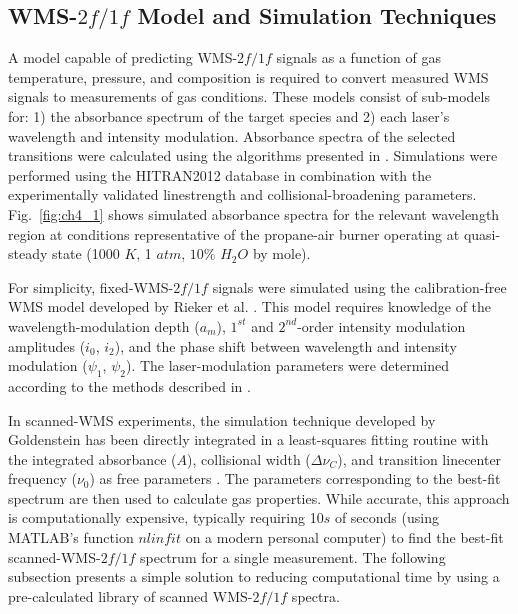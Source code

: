 \subsection{WMS-$2f/1f$ Model and Simulation Techniques}
A model capable of predicting WMS-$2f/1f$ signals as a function of gas temperature, pressure, and composition is required to convert measured WMS signals to measurements of gas conditions. These models consist of sub-models for: 1) the absorbance spectrum of the target species and 2) each laser's wavelength and intensity modulation.
Absorbance spectra of the selected transitions were calculated using the algorithms presented in \cite{GOLDENSTEIN2017249}. Simulations were performed using the HITRAN2012 database \cite{2013JQSRT.130....4R} in combination with the experimentally validated linestrength and collisional-broadening parameters. Fig.\ \ref{fig:ch4_1} shows simulated absorbance spectra for the relevant wavelength region at conditions representative of the propane-air burner operating at quasi-steady state (1000 $K$, 1 $atm$, $10\%$ $H_2O$ by mole). 

For simplicity, fixed-WMS-$2f/1f$ signals were simulated using the calibration-free WMS model developed by Rieker et al. \cite{rieker2009calibration}. This model requires knowledge of the wavelength-modulation depth ($a_m$), $1^{st}$ and $2^{nd}$-order intensity modulation amplitudes ($i_0$, $i_2$), and the phase shift between wavelength and intensity modulation ($\psi_1$, $\psi_2$). The laser-modulation parameters were determined according to the methods described in \cite{rieker2009calibration}.

In scanned-WMS experiments, the simulation technique developed by Goldenstein has been directly integrated in a least-squares fitting routine with the integrated absorbance ($A$), collisional width ($\Delta\nu_C$), and transition linecenter frequency ($\nu_0$) as free parameters \cite{Goldenstein:16,Goldenstein2014,goldenstein2014scanned,spearrin2014simultaneous}. The parameters corresponding to the best-fit spectrum are then used to calculate gas properties. While accurate, this approach is computationally expensive, typically requiring 10$s$ of seconds (using MATLAB's function $nlinfit$ on a modern personal computer) to find the best-fit scanned-WMS-$2f/1f$ spectrum for a single measurement. The following subsection presents a simple solution to reducing computational time by using a pre-calculated library of scanned WMS-$2f/1f$ spectra.

